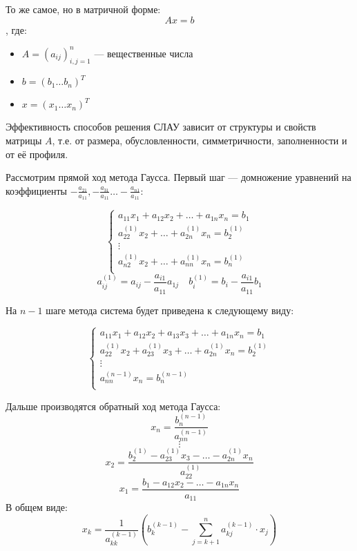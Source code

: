 То же самое, но в матричной форме:
\[Ax = b\]
, где:
\begin{itemize}
    \item \(A = (a_{ij})_{i,j = 1}^n\) --- вещественные числа
    \item \(b = (b_1 \dots b_n)^T\)
    \item \(x = (x_1 \dots x_n)^T\)
\end{itemize}

Эффективность способов решения СЛАУ зависит от структуры и свойств матрицы \(A\), т.е. от размера, обусловленности, симметричности, заполненности и от её профиля.

Рассмотрим прямой ход метода Гаусса. Первый шаг --- домножение уравнений на коэффициенты \( - \frac{a_{21}}{a_{11}}, - \frac{a_{31}}{a_{11}} \dots - \frac{a_{n1}}{a_{11}}\):

\begin{equation}
    \label{СЛАУ первый шаг}
    \begin{cases}
        a_{11} x_1 + a_{12} x_2 + \dots + a_{1n} x_n = b_1      \\
        a_{22}^{(1)} x_2 + \dots + a_{2n}^{(1)} x_n = b_2^{(1)} \\
        \vdots                                                  \\
        a_{n2}^{(1)} x_2 + \dots + a_{nn}^{(1)} x_n = b_n^{(1)} \\
    \end{cases}
\end{equation}
\[a_{ij}^{(1)} = a_{ij} - \frac{a_{i1}}{a_{11}} a_{1j} \quad b_i^{(1)} = b_i - \frac{a_{i1}}{a_{11}} b_1 \]

На \(n - 1\) шаге метода система будет приведена к следующему виду:

\begin{equation}
    \begin{cases}
        a_{11} x_1 + a_{12} x_2 + a_{13} x_3 + \dots + a_{1n} x_n = b_1            \\
        a_{22}^{(1)} x_2 + a_{23}^{(1)} x_3 + \dots + a_{2n}^{(1)} x_n = b_2^{(1)} \\
        \vdots                                                                     \\
        a_{nn}^{(n - 1)} x_n = b_n^{(n - 1)}                                       \\
    \end{cases}
\end{equation}

Дальше производятся обратный ход метода Гаусса:
\[x_n = \frac{b_n^{(n - 1)}}{a_{nn}^{(n - 1)}}\]
\[\vdots\]
\[x_2 = \frac{b_2^{(1)} - a_{23}^{(1)} x_3 - \dots - a_{2n}^{(1)} x_n}{a_{22}^{(1)}}\]
\[x_1 = \frac{b_1 - a_{12} x_2 - \dots - a_{1n} x_n}{a_{11}}\]
В общем виде:
\[x_k = \frac{1}{a_{kk}^{(k - 1)}} \left( b_k^{(k - 1)} - \sum_{j = k + 1}^n a_{kj}^{(k - 1)} \cdot x_j \right)\]


